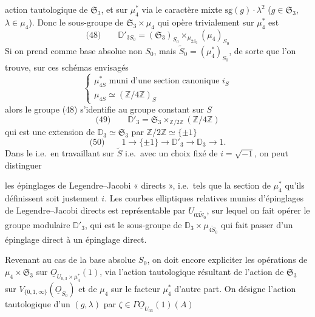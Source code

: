 \documentclass[11pt,a4paper]{article}
\begin{document}
action tautologique de $\mathfrak{S}_3$, et sur $\mu_4^{*}$ via le
caractère mixte $\mathrm{sg}(g) \cdot \lambda^2$
($g \in \mathfrak{S}_3$, $\lambda \in \mu_4$). Donc le sous-groupe de
$\mathfrak{S}_3 \times \mu_4$ qui opère trivialement sur $\mu_4^{*}$ est
\[
  \text{(48)} \qquad \mathbb{D}'_{3S_0} = (\mathfrak{S}_3)_{S_0}
  \times_{\mu_{2S_0}} (\mu_4)_{S_0}
\]
Si on prend comme base absolue non $S_0$, mais
$\widetilde{S}_0 = (\mu_4^{*})_{S_0}$, de sorte que l'on trouve, sur ces
schémas  envisagés
\[
  \begin{cases}
    \mu_{4S}^{*} \text{ muni d'une section canonique } i_S \\
    \mu_{4S} \simeq (\mathbb{Z}/4\mathbb{Z})_S
  \end{cases}
\]
alors le groupe (48) s'identifie au groupe constant sur $S$
 
\[
  \text{(49)} \qquad \mathbb{D}'_3 = \mathfrak{S}_3 \times_{\mathbb{Z}/2\mathbb{Z}} (\mathbb{Z}/4\mathbb{Z})
\]
qui est une extension de $\mathbb{D}_3 \simeq \mathfrak{S}_3$ par
$\mathbb{Z}/2\mathbb{Z} \simeq \{\pm 1\}$
\[
  \text{(50)} \qquad 1 \to \{\pm 1\} \to \mathbb{D}'_3 \to \mathbb{D}_3 \to 1 .
\]
Dans le  i.e.\ en travaillant sur
$\widetilde{S}$ i.e.\ avec un choix fixé de $i = \sqrt{-1}$, on peut
distinguer

les \struck{\ill{}} épinglages de Legendre--Jacobi « directs », i.e.\ tels
que la section de $\mu_4^{*}$ qu'ils définissent soit justement $i$.
\struck{\ill{}} Les  courbes elliptiques relatives
 munies d'épinglages de Legendre--Jacobi
directs est représentable par $U_{03\widetilde{S}_0}$, sur lequel on fait
opérer le groupe modulaire $\mathbb{D}'_3$, qui est  le
 sous-groupe de
$\mathbb{D}_3 \times \mu_{4\widetilde{S}_0}$ qui fait passer d'un épinglage
direct à un épinglage direct.

Revenant au cas de la base absolue $S_0$, on doit encore expliciter les
opérations de $\mu_4 \times \mathfrak{S}_3$ sur
$\underline{O}_{U_{0,3} \times \mu_4^{*}}(1)$, via l'action tautologique
résultant de l'action de $\mathfrak{S}_3$ sur
$V_{\{0,1,\infty\}}(\underline{O}_{S_0})$ et 
de $\mu_4$ sur le facteur $\mu_4^{*}$ d'autre part. On désigne l'action
tautologique d'un $(g, \lambda)$ par
$\zeta \in \Gamma\underline{O}_{U_{03}}(1)(A)$
\end{document}
